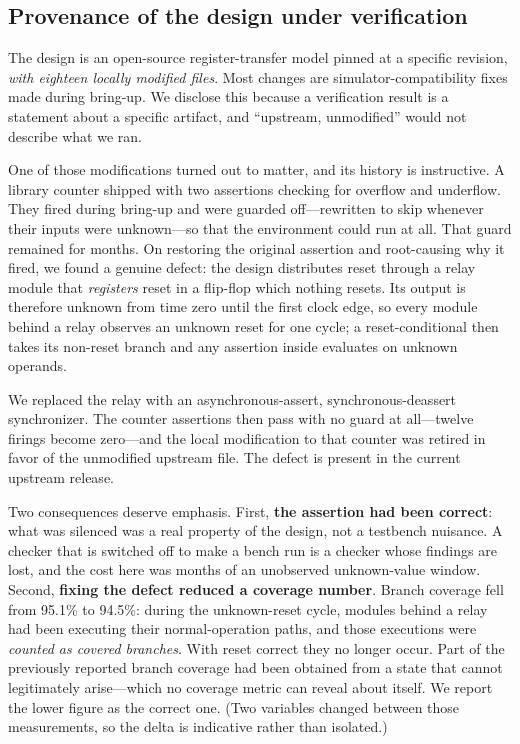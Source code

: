 \documentclass[conference]{IEEEtran}
\begin{document}

\subsection{Provenance of the design under verification}
\label{sec:provenance}

The design is an open-source register-transfer model pinned at a specific
revision, \emph{with eighteen locally modified files}. Most changes are
simulator-compatibility fixes made during bring-up. We disclose this because a
verification result is a statement about a specific artifact, and ``upstream,
unmodified'' would not describe what we ran.

One of those modifications turned out to matter, and its history is instructive.
A library counter shipped with two assertions checking for overflow and
underflow. They fired during bring-up and were guarded off---rewritten to skip
whenever their inputs were unknown---so that the environment could run at all.
That guard remained for months. On restoring the original assertion and
root-causing why it fired, we found a genuine defect: the design distributes
reset through a relay module that \emph{registers} reset in a flip-flop which
nothing resets. Its output is therefore unknown from time zero until the first
clock edge, so every module behind a relay observes an unknown reset for one
cycle; a reset-conditional then takes its non-reset branch and any assertion
inside evaluates on unknown operands.

We replaced the relay with an asynchronous-assert, synchronous-deassert
synchronizer. The counter assertions then pass with no guard at all---twelve
firings become zero---and the local modification to that counter was retired in
favor of the unmodified upstream file. The defect is present in the current
upstream release.

Two consequences deserve emphasis. First, \textbf{the assertion had been
correct}: what was silenced was a real property of the design, not a testbench
nuisance. A checker that is switched off to make a bench run is a checker whose
findings are lost, and the cost here was months of an unobserved
unknown-value window. Second, \textbf{fixing the defect reduced a coverage
number}. Branch coverage fell from 95.1\% to 94.5\%: during the unknown-reset
cycle, modules behind a relay had been executing their normal-operation paths,
and those executions were \emph{counted as covered branches}. With reset
correct they no longer occur. Part of the previously reported branch coverage
had been obtained from a state that cannot legitimately arise---which no
coverage metric can reveal about itself. We report the lower figure as the
correct one. (Two variables changed between those measurements, so the delta is
indicative rather than isolated.)
\end{document}
